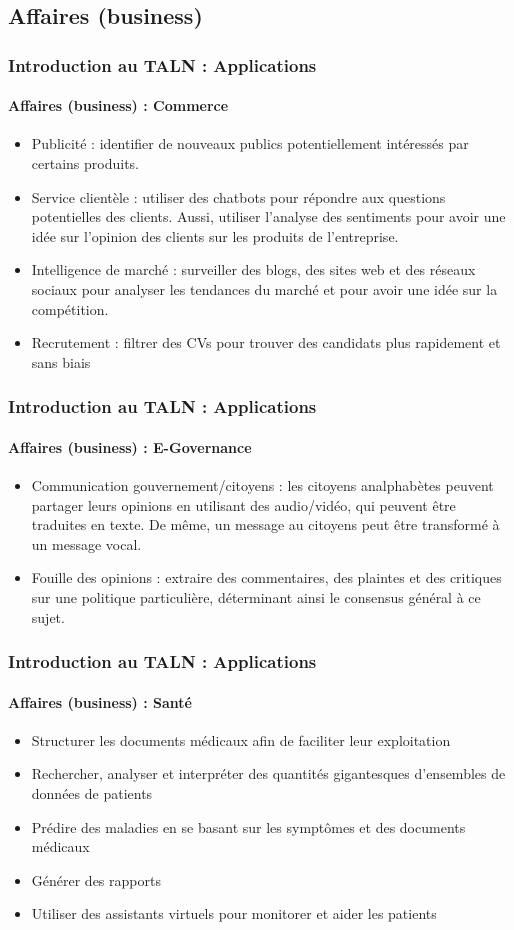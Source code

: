 \documentclass[xcolor=table]{beamer}
\begin{document}
\subsection{Affaires (business)}

\begin{frame}
\frametitle{Introduction au TALN : Applications}
\framesubtitle{Affaires (business) : Commerce}

\begin{itemize}
	\item Publicité : identifier de nouveaux publics potentiellement intéressés par certains produits.
	\item Service clientèle : utiliser des chatbots pour répondre aux questions potentielles des clients. Aussi, utiliser l'analyse des sentiments pour avoir une idée sur l'opinion des clients sur les produits de l'entreprise.
	\item Intelligence de marché : surveiller des blogs, des sites web et des réseaux sociaux pour analyser les tendances du marché et pour avoir une idée sur la compétition.
	\item Recrutement : filtrer des CVs pour trouver des candidats plus rapidement et sans biais
\end{itemize}

\end{frame}

\begin{frame}
\frametitle{Introduction au TALN : Applications}
\framesubtitle{Affaires (business) : E-Governance}

\begin{itemize}
	\item Communication gouvernement/citoyens : les citoyens analphabètes peuvent partager leurs opinions en utilisant des audio/vidéo, qui peuvent être traduites en texte. De même, un message au citoyens peut être transformé à un message vocal.
	\item Fouille des opinions : extraire des commentaires, des plaintes et des critiques sur une politique particulière, déterminant ainsi le consensus général à ce sujet.
\end{itemize}

\end{frame}

\begin{frame}
\frametitle{Introduction au TALN : Applications}
\framesubtitle{Affaires (business) : Santé}

\begin{itemize}
	\item Structurer les documents médicaux afin de faciliter leur exploitation
	\item Rechercher, analyser et interpréter des quantités gigantesques d'ensembles de données de patients
	\item Prédire des maladies en se basant sur les symptômes et des documents médicaux
	\item Générer des rapports 
	\item Utiliser des assistants virtuels pour monitorer et aider les patients
\end{itemize}

\end{frame}
\end{document}
